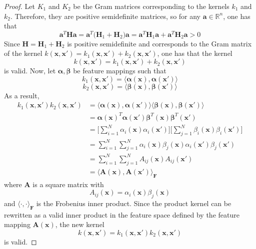\begin{proof}
    Let $K_1$ and $K_2$ be the Gram matrices corresponding to the 
    kernels $k_1$ and $k_2$. Therefore, they are positive semidefinite matrices, so
    for any $\mathbf{a} \in \mathbb{R}^n$, one has that
    \[
        \mathbf{a}^T\mathbf{H}\mathbf{a}
        = \mathbf{a}^T\big(\mathbf{H}_1 + \mathbf{H}_2\big)\mathbf{a}
        = \mathbf{a}^T \mathbf{H}_1 \mathbf{a} + \mathbf{a}^T \mathbf{H}_2 \mathbf{a} > 0
    \] 
    Since $\mathbf{H} = \mathbf{H}_1 + \mathbf{H}_2$ is positive semidefinite
    and corresponds to the Gram matrix of the 
    kernel $k(\mathbf{x}, \mathbf{x}') = k_1(\mathbf{x}, \mathbf{x'}) + 
    k_2(\mathbf{x}, \mathbf{x}')$, one has that the kernel
    \begin{equation}\label{eq:6.17}\tag{6.17}
        k(\mathbf{x}, \mathbf{x}') = k_1(\mathbf{x}, \mathbf{x}') + k_2(\mathbf{x}, \mathbf{x}')
    \end{equation}
    is valid. Now, let $\bm{\alpha}, \bm{\beta}$ be feature mappings such that
    \[
        k_1(\mathbf{x}, \mathbf{x}') 
        = \langle \bm{\alpha}(\mathbf{x}), \bm{\alpha}(\mathbf{x}') \rangle 
    \] 
    \[
        k_2(\mathbf{x}, \mathbf{x}') 
        = \langle \bm{\beta}(\mathbf{x}), \bm{\beta}(\mathbf{x}') \rangle 
    \]
    As a result,
    \begin{align*}
        k_1(\mathbf{x}, \mathbf{x}') k_2(\mathbf{x}, \mathbf{x}')
        &= \langle \bm{\alpha}(\mathbf{x}), \bm{\alpha}(\mathbf{x}') \rangle 
        \langle \bm{\beta}(\mathbf{x}), \bm{\beta}(\mathbf{x}') \rangle \\
        &= \bm{\alpha}(\mathbf{x})^T \bm{\alpha}(\mathbf{x}')
        \bm{\beta}^T(\mathbf{x}) \bm{\beta}^T(\mathbf{x}') \\
        &= \bigg[\sum_{i=1}^{N} \alpha_i(\mathbf{x}) \alpha_i(\mathbf{x}')\bigg]
        \bigg[\sum_{j=1}^{N} \beta_i(\mathbf{x}) \beta_i(\mathbf{x}')\bigg] \\
        &= \sum_{i=1}^{N} \sum_{j=1}^{N} \alpha_i(\mathbf{x}) \beta_j(\mathbf{x})
        \alpha_i(\mathbf{x}') \beta_j(\mathbf{x}') \\
        &= \sum_{i=1}^{N} \sum_{j=1}^{N}  A_{ij}(\mathbf{x}) A_{ij}(\mathbf{x}') \\
        &= \langle \mathbf{A}(\mathbf{x}), \mathbf{A}(\mathbf{x'}) \rangle_\mathbf{F}
    \end{align*}
    where $\mathbf{A}$ is a square matrix with
    \[
        A_{ij}(\mathbf{x}) = \alpha_i(\mathbf{x}) \beta_j(\mathbf{x})
    \] 
    and $\langle \cdot, \cdot \rangle_\mathbf{F}$ is the Frobenius inner product.
    Since the product kernel can be rewritten as a valid inner product in the 
    feature space defined by the feature mapping $\mathbf{A}(\mathbf{x})$,
    the new kernel
    \begin{equation}\label{eq:6.18}\tag{6.18}
        k(\mathbf{x}, \mathbf{x}')
        = k_1(\mathbf{x}, \mathbf{x}') k_2(\mathbf{x}, \mathbf{x}')
    \end{equation}
    is valid.
\end{proof}

